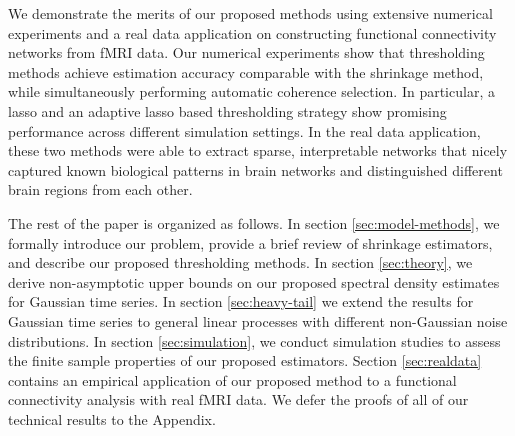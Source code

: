 We demonstrate the merits of our proposed methods using extensive numerical experiments and a real data application on constructing functional connectivity networks from fMRI data. Our numerical experiments show that thresholding methods achieve  estimation accuracy comparable with  the shrinkage method, while simultaneously performing automatic coherence selection. In particular, a  lasso and an adaptive lasso based thresholding strategy show promising performance across different simulation settings. In the real data application, these two methods were able to extract  sparse, interpretable networks that nicely captured known biological patterns in brain networks and distinguished different brain regions from each other.





The rest of the paper is organized as follows. In section \ref{sec:model-methods}, we formally introduce our problem, provide a brief review of shrinkage estimators, and describe our proposed thresholding methods. In section \ref{sec:theory}, we derive non-asymptotic upper bounds on our proposed spectral density estimates for Gaussian time series. In section \ref{sec:heavy-tail} we extend the results for Gaussian time series to general linear processes with different non-Gaussian noise distributions. In section \ref{sec:simulation}, we conduct simulation studies to assess the finite sample properties of our proposed estimators. Section \ref{sec:realdata} contains an empirical application of our proposed method to a functional connectivity analysis with real fMRI data. We defer the proofs of all of our technical results to the Appendix. 




